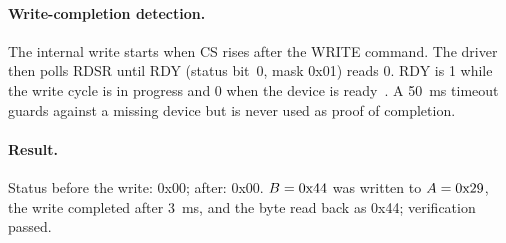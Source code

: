 \paragraph{Write-completion detection.}
The internal write starts when CS rises after the WRITE command. The driver
then polls RDSR until RDY (status bit~0, mask 0x01) reads 0. RDY is 1 while the
write cycle is in progress and 0 when the device is ready~\cite[p.~5,
Tab.~10]{eeprom}. A \SI{50}{\milli\second} timeout guards against a missing
device but is never used as proof of completion.

\paragraph{Result.}
Status before the write: 0x00; after: 0x00.
$B = \text{0x44}$ was written to $A = \text{0x29}$, the write completed after
\SI{3}{\milli\second}, and the byte read back as 0x44; verification passed.

